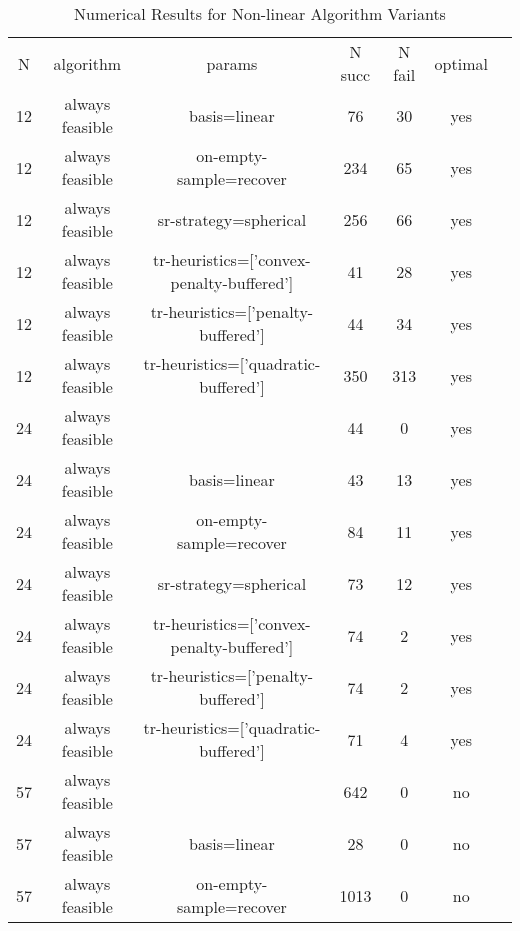 \begin{scriptsize}
\begin{center}
\begin{longtable}{ccccccc}
\caption{Numerical Results for Non-linear Algorithm Variants} \\
\label{nonlinear_variants_results}
  N &       algorithm &                                    params & N succ & N fail & optimal\\
 12 & always feasible &                              basis=linear &     76 &     30 &     yes\\
 12 & always feasible &                   on-empty-sample=recover &    234 &     65 &     yes\\
 12 & always feasible &                     sr-strategy=spherical &    256 &     66 &     yes\\
 12 & always feasible & tr-heuristics=['convex-penalty-buffered'] &     41 &     28 &     yes\\
 12 & always feasible &        tr-heuristics=['penalty-buffered'] &     44 &     34 &     yes\\
 12 & always feasible &      tr-heuristics=['quadratic-buffered'] &    350 &    313 &     yes\\
 24 & always feasible &                                           &     44 &      0 &     yes\\
 24 & always feasible &                              basis=linear &     43 &     13 &     yes\\
 24 & always feasible &                   on-empty-sample=recover &     84 &     11 &     yes\\
 24 & always feasible &                     sr-strategy=spherical &     73 &     12 &     yes\\
 24 & always feasible & tr-heuristics=['convex-penalty-buffered'] &     74 &      2 &     yes\\
 24 & always feasible &        tr-heuristics=['penalty-buffered'] &     74 &      2 &     yes\\
 24 & always feasible &      tr-heuristics=['quadratic-buffered'] &     71 &      4 &     yes\\
 57 & always feasible &                                           &    642 &      0 &      no\\
 57 & always feasible &                              basis=linear &     28 &      0 &      no\\
 57 & always feasible &                   on-empty-sample=recover &   1013 &      0 &      no\\

\end{longtable}
\end{center}
\end{scriptsize}
